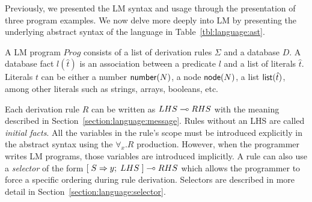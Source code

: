 Previously, we presented the LM syntax and usage through the presentation of
three program examples. We now delve more deeply into LM by presenting the
underlying abstract syntax of the language in Table~\ref{tbl:language:ast}.

A LM program $Prog$ consists of a list of derivation rules $\Sigma$ and a
database $D$. A database fact $l(\hat{t})$ is an association between a predicate
$l$ and a list of literals $\hat{t}$. Literals $t$ can be either a number
$\mathsf{number}(N)$, a node $\mathsf{node}(N)$, a list $\mathsf{list}(\hat{t})$, among other
literals such as strings, arrays, booleans, etc.

Each derivation rule $R$ can be written as $LHS \multimap RHS$ with the meaning
described in Section~\ref{section:language:message}. Rules without an LHS are
called \emph{initial facts}. All the variables in the rule's scope must be
introduced explicitly in the abstract syntax using the $\forall_x. R$
production. However, when the programmer writes LM programs, those variables are
introduced implicitly. A rule can also use a \emph{selector} of the form
$[\; S \Rightarrow y; \; LHS \;] \multimap RHS$ which allows the programmer to force a specific
ordering during rule derivation. Selectors are described in more detail in
Section~\ref{section:language:selector}.

\newcommand{\sop}[0]{\Vert}

